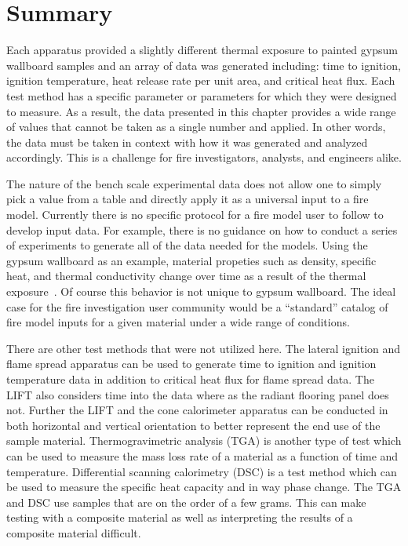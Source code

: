 \documentclass[twoside]{uocthesis}
\begin{document}
{\section{Summary}

Each apparatus provided a slightly different thermal exposure to painted gypsum wallboard samples and an array of data was generated including: time to ignition, ignition temperature, heat release rate per unit area, and critical heat flux.  Each test method has a specific parameter or parameters for which they were designed to measure. As a result, the data presented in this chapter provides a wide range of values that cannot be taken as a single number and applied.  In other words, the data must be taken in context with how it was generated and analyzed accordingly. This is a challenge for fire investigators, analysts, and engineers alike.  

The nature of the bench scale experimental data does not allow one to simply pick a value from a table and directly apply it as a universal input to a fire model.   Currently there is no specific protocol for a fire model user to follow to develop input data.  For example, there is no guidance on how to conduct a series of experiments to generate all of the data needed for the models.  Using the gypsum wallboard as an example, material propeties such as density, specific heat, and thermal conductivity change over time as a result of the thermal exposure~\cite{Schroeder:1999,McGraw:1999}.  Of course this behavior is not unique to gypsum wallboard. The ideal case for the fire investigation user community would be a ``standard'' catalog of fire model inputs for a given material under a wide range of conditions.

There are other test methods that were not utilized here.  The lateral ignition and flame spread apparatus can be used to generate time to ignition and ignition temperature data in addition to critical heat flux for flame spread data.  The LIFT also considers time into the data where as the radiant flooring panel does not.  Further the LIFT and the cone calorimeter apparatus can be conducted in both horizontal and vertical orientation to better represent the end use of the sample material.  Thermogravimetric analysis (TGA) is another type of test which can be used to measure the mass loss rate of a material as a function of time and temperature.  Differential scanning calorimetry (DSC) is a test method which can be used to measure the specific heat capacity and in way phase change.  The TGA and DSC use samples that are on the order of a few grams.  This can make testing with a composite material as well as interpreting the results of a composite material difficult.   

}
\end{document}

